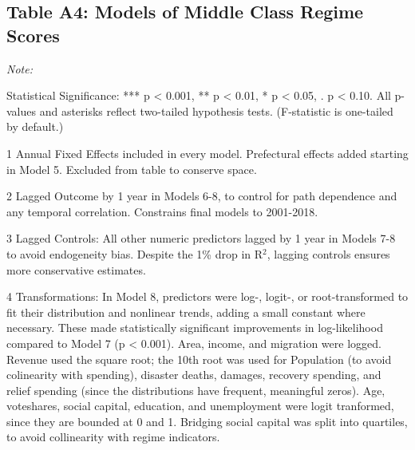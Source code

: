 \documentclass[preprint, 3p,
authoryear]{elsarticle} %
\begin{document}
\newpage
\begin{landscape}

\hypertarget{table-a4-models-of-middle-class-regime-scores}{%
\subsection{Table A4: Models of Middle Class Regime
Scores}\label{table-a4-models-of-middle-class-regime-scores}}

\renewcommand{\baselinestretch}{0.5}\selectfont
\renewcommand{\arraystretch}{1.5}

\begingroup\fontsize{10}{12}\selectfont

\begin{ThreePartTable}
\begin{TableNotes}
\item \textit{Note: } 
\item Statistical Significance: *** p < 0.001, ** p < 0.01, * p < 0.05, . p < 0.10. All p-values and asterisks reflect two-tailed hypothesis tests. (F-statistic is one-tailed by default.)
\item[1] Annual Fixed Effects included in every model. Prefectural effects added starting in Model 5. Excluded from table to conserve space.
\item[2] Lagged Outcome by 1 year in Models 6-8, to control for path dependence and any temporal correlation. Constrains final models to 2001-2018.
\item[3] Lagged Controls: All other numeric predictors lagged by 1 year in Models 7-8 to avoid endogeneity bias. Despite the 1\% drop in R$^{2}$, lagging controls ensures more conservative estimates.
\item[4] Transformations: In Model 8, predictors were log-, logit-, or root-transformed to fit their distribution and nonlinear trends, adding a small constant where necessary. These made statistically significant improvements in log-likelihood compared to Model 7 (p < 0.001). Area, income, and migration were logged. Revenue used the square root; the 10th root was used for Population (to avoid colinearity with spending), disaster deaths, damages, recovery spending, and relief spending (since the distributions have frequent, meaningful zeros). Age, voteshares, social capital, education, and unemployment were logit tranformed, since they are bounded at 0 and 1. Bridging social capital was split into quartiles, to avoid collinearity with regime indicators.
\end{TableNotes}
\begin{longtabu} to 

\end{longtabu}
\end{ThreePartTable}
\end{landscape}
\end{document}
